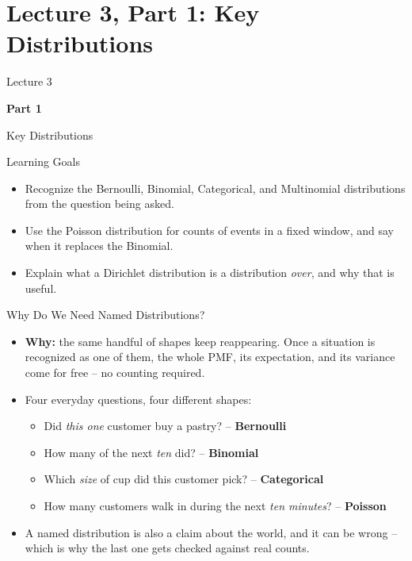 \section{Lecture 3, Part 1: Key Distributions}

\begin{frame}
\vfill
\centering
{\color{RLBlue}\large Lecture 3}

\vspace{0.3em}
{\color{RLBlue}\Large\bfseries Part 1}

\vspace{0.6em}
{\Large Key Distributions}
\vfill
\end{frame}

\begin{frame}{Learning Goals}
\begin{itemize}
  \item Recognize the Bernoulli, Binomial, Categorical, and Multinomial distributions from the question being asked.
  \pause
  \item Use the Poisson distribution for counts of events in a fixed window, and say when it replaces the Binomial.
  \pause
  \item Explain what a Dirichlet distribution is a distribution \emph{over}, and why that is useful.
\end{itemize}
\end{frame}

\begin{frame}{Why Do We Need Named Distributions?}
\begin{itemize}
  \item \textbf{Why:} the same handful of shapes keep reappearing. Once a situation is recognized as one of them, the whole PMF, its expectation, and its variance come for free -- no counting required.
  \pause
  \item Four everyday questions, four different shapes:
  \begin{itemize}
    \item Did \emph{this one} customer buy a pastry? -- \textbf{Bernoulli}
    \item How many of the next \emph{ten} did? -- \textbf{Binomial}
    \item Which \emph{size} of cup did this customer pick? -- \textbf{Categorical}
    \item How many customers walk in during the next \emph{ten minutes}? -- \textbf{Poisson}
  \end{itemize}
  \pause
  \item A named distribution is also a claim about the world, and it can be wrong -- which is why the last one gets checked against real counts.
\end{itemize}
\end{frame}

